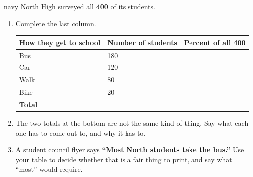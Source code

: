 \vspace{0.04in}

\begin{scenariobox}{navy}
North High surveyed all \textbf{400} of its students.

\vspace{5pt}
\normalsize
\begin{enumerate}[label=\textbf{\alph*.}, leftmargin=1.8em, itemsep=6pt]
  \item Complete the last column.

        \vspace{3pt}
        \renewcommand{\arraystretch}{1.35}
        \begin{tabularx}{\linewidth}{@{} l Y Y @{}}
        \textbf{How they get to school} & \textbf{Number of students} &
        \textbf{Percent of all 400} \\
        \hline
        Bus  & 180 &  \\
        Car  & 120 &  \\
        Walk &  80 &  \\
        Bike &  20 &  \\
        \hline
        \textbf{Total} &  &  \\
        \end{tabularx}
  \item The two totals at the bottom are not the same kind of thing. Say what each one has to
        come out to, and why it has to.
  \item A student council flyer says \textbf{``Most North students take the bus.''} Use your
        table to decide whether that is a fair thing to print, and say what ``most'' would
        require.
\end{enumerate}
\end{scenariobox}

